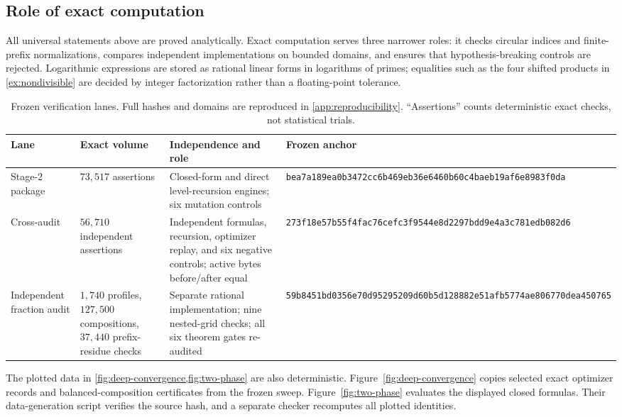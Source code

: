 \subsection{Role of exact computation}

All universal statements above are proved analytically.  Exact computation
serves three narrower roles: it checks circular indices and finite-prefix
normalizations, compares independent implementations on bounded domains, and
ensures that hypothesis-breaking controls are rejected.  Logarithmic
expressions are stored as rational linear forms in logarithms of primes;
equalities such as the four shifted products in
\cref{ex:nondivisible} are decided by integer factorization rather than a
floating-point tolerance.

\begin{table}[t]
\centering
\small
\setlength{\tabcolsep}{3pt}
\caption{Frozen verification lanes.  Full hashes and domains are reproduced
in \cref{app:reproducibility}.  ``Assertions'' counts deterministic exact
checks, not statistical trials.}
\label{tab:verification}
\begin{tabular}{@{}P{0.17\textwidth}P{0.25\textwidth}P{0.31\textwidth}P{0.19\textwidth}@{}}
\toprule
Lane & Exact volume & Independence and role & Frozen anchor \\
\midrule
Stage-2 package
& $73{,}517$ assertions
& Closed-form and direct level-recursion engines; six mutation controls
& \texttt{bea7a189\allowbreak ea0b3472\allowbreak cc6b469e\allowbreak b36e6460\allowbreak b60c4bae\allowbreak b19af6e8\allowbreak 983f0da} \\
\addlinespace
Cross-audit
& $56{,}710$ independent assertions
& Independent formulas, recursion, optimizer replay, and six negative controls; active bytes before/after equal
& \texttt{273f18e5\allowbreak 7b55f4fa\allowbreak c76cefc3\allowbreak f9544e8d\allowbreak 2297bdd9\allowbreak e4a3c781\allowbreak edb082d6} \\
\addlinespace
Independent fraction audit
& $1{,}740$ profiles, $127{,}500$ compositions, $37{,}440$ prefix-residue checks
& Separate rational implementation; nine nested-grid checks; all six theorem gates re-audited
& \texttt{59b8451b\allowbreak d0356e70\allowbreak d9529520\allowbreak 9d60b5d1\allowbreak 28882e51\allowbreak afb5774a\allowbreak e806770d\allowbreak ea450765} \\
\bottomrule
\end{tabular}
\end{table}

The plotted data in \cref{fig:deep-convergence,fig:two-phase} are also
deterministic.  Figure~\ref{fig:deep-convergence} copies selected exact
optimizer records and balanced-composition certificates from the frozen
sweep.  Figure~\ref{fig:two-phase} evaluates the displayed closed formulas.
Their data-generation script verifies the source hash, and a separate checker
recomputes all plotted identities.

